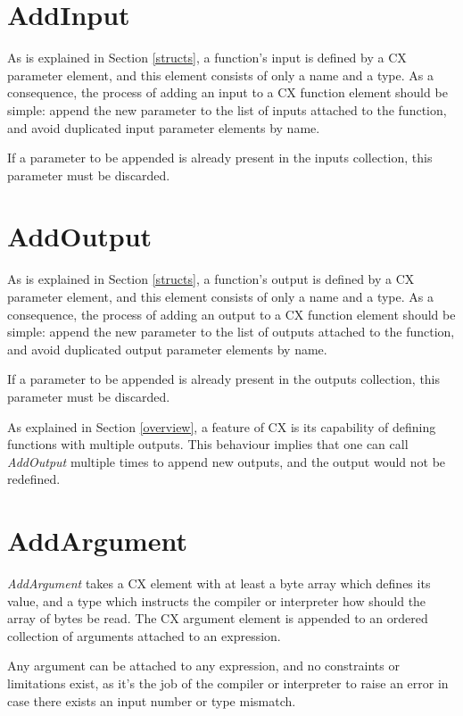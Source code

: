 \section{AddInput}
\label{addinput}

As is explained in Section \ref{structs}, a function's input is defined by a CX
parameter element, and this element consists of only a name and a type. As a
consequence, the process of adding an input to a CX function element should be
simple: append the new parameter to the list of inputs attached to the
function, and avoid duplicated input parameter elements by name. 

If a parameter to be appended is already present in the inputs collection, this
parameter must be discarded.

\section{AddOutput}
\label{addoutput}

As is explained in Section \ref{structs}, a function's output is defined by a CX
parameter element, and this element consists of only a name and a type. As a
consequence, the process of adding an output to a CX function element should be
simple: append the new parameter to the list of outputs attached to the
function, and avoid duplicated output parameter elements by name. 

If a parameter to be appended is already present in the outputs collection, this
parameter must be discarded.

As explained in Section \ref{overview}, a feature of CX is its capability of
defining functions with multiple outputs. This behaviour implies that one can
call \textit{AddOutput} multiple times to append new outputs, and the output
would not be redefined.

\section{AddArgument}
\label{addargument}

\textit{AddArgument} takes a CX element with at least a byte array which defines
its value, and a type which instructs the compiler or interpreter how should the
array of bytes be read. The CX argument element is appended to an ordered
collection of arguments attached to an expression.

Any argument can be attached to any expression, and no constraints or
limitations exist, as it's the job of the compiler or interpreter to raise an
error in case there exists an input number or type mismatch.

